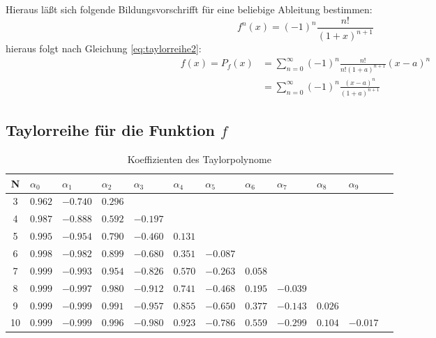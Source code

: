 \documentclass{beamer}
\begin{document}
  \begin{frame}
    Hieraus läßt sich folgende Bildungsvorschrifft für eine beliebige Ableitung bestimmen:
    \begin{equation}
        f^n\left(x\right) = \left(-1\right)^n \frac{n!}{\left(1+x\right)^{n+1}}
    \end{equation}
    hieraus folgt nach Gleichung \ref{eq:taylorreihe2}:
    \begin{align}
        f\left(x\right)  =  P_f\left(x\right) 
                        &= \sum_{n=0}^{\infty} \left(-1\right)^n
                            \frac{n!}{n!\left(1+a\right)^{n+1}}\left(x-a\right)^n\\
                        &=  \sum_{n=0}^{\infty} \left(-1\right)^n
                            \frac{\left(x-a\right)^n}{\left(1+a\right)^{n+1}}
    \end{align}
  \end{frame}
    
  \subsection{Taylorreihe für die Funktion $f$}
  \begin{frame}
    \centering    
    \begin{table}[htbp]
    \tiny   
    \renewcommand{\arraystretch}{1.5}
    \begin{tabularx}{\textwidth}{|c|X|X|X|X|X|X|X|X|X|X|X|}
        \hline    
        N & $\alpha_0$&$\alpha_1$&$\alpha_2$&$\alpha_3$&$\alpha_4$&$\alpha_5$&$\alpha_6$&$\alpha_7$&$\alpha_8$&$\alpha_9$\\\hline
        3 & $0.962$ & $-0.740$ & $0.296$ &&&&&&& \\\hline
        4 & $0.987$ & $-0.888$ & $0.592$ & $-0.197$ &&&&&& \\\hline
        5 & $0.995$ & $-0.954$ & $0.790$ & $-0.460$ & $0.131$ &&&&& \\\hline
        6 & $0.998$ & $-0.982$ & $0.899$ & $-0.680$ & $0.351$ & $-0.087$ &&&& \\\hline
        7 & $0.999$ & $-0.993$ & $0.954$ & $-0.826$ & $0.570$ & $-0.263$ & $0.058$ &&& \\\hline
        8 & $0.999$ & $-0.997$ & $0.980$ & $-0.912$ & $0.741$ & $-0.468$ & $0.195$ & $-0.039$ && \\\hline
        9 & $0.999$ & $-0.999$ & $0.991$ & $-0.957$ & $0.855$ & $-0.650$ & $0.377$ & $-0.143$ & $0.026$ & \\\hline
        10& $0.999$ & $-0.999$ & $0.996$ & $-0.980$ & $0.923$ & $-0.786$ & $0.559$ & $-0.299$ & $0.104$ & $-0.017$ \\\hline
    \end{tabularx}
    \caption{Koeffizienten des Taylorpolynome}      
    \end{table}
  \end{frame}
  
\end{document}
